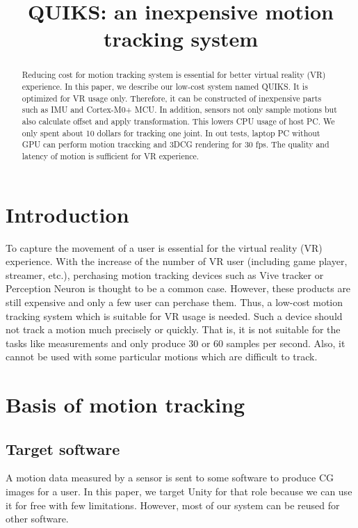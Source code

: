 \documentclass[journal]{IEEEtran}
\begin{document}
\title{QUIKS: an inexpensive motion tracking system}
\author{}
\maketitle
\begin{abstract}
Reducing cost for motion tracking system is essential for better virtual reality (VR) experience.
In this paper, we describe our low-cost system named QUIKS.
It is optimized for VR usage only.
Therefore, it can be constructed of inexpensive parts such as IMU and Cortex-M0+ MCU.
In addition, sensors not only sample motions but also calculate offset and apply transformation.
This lowers CPU usage of host PC.
We only spent about 10 dollars for tracking one joint.
In out tests, laptop PC without GPU can perform motion traccking and 3DCG rendering for 30 fps.
The quality and latency of motion is sufficient for VR experience.
\end{abstract}

\section{Introduction}
To capture the movement of a user is essential for the virtual reality (VR) experience.
With the increase of the number of VR user (including game player, streamer, etc.), perchasing motion tracking devices such as Vive tracker or Perception Neuron is thought to be a common case.
However, these products are still expensive and only a few user can perchase them.
Thus, a low-cost motion tracking system which is suitable for VR usage is needed.
Such a device should not track a motion much precisely or quickly.
That is, it is not suitable for the tasks like measurements and only produce 30 or 60 samples per second.
Also, it cannot be used with some particular motions which are difficult to track.

\section{Basis of motion tracking}
\subsection{Target software}
A motion data measured by a sensor is sent to some software to produce CG images for a user.
In this paper, we target Unity for that role because we can use it for free with few limitations.
However, most of our system can be reused for other software.
\end{document}
